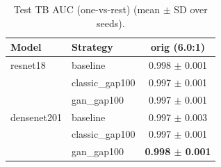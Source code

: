 \begin{table}[htbp]
\centering
\caption{Test TB AUC (one-vs-rest) (mean $\pm$ SD over seeds).}
\label{tab:tb_auc}
\begin{tabular}{llc}
\toprule
Model & Strategy & orig (6.0:1) \\
\midrule
resnet18 & baseline & 0.998 $\pm$ 0.001 \\
 & classic\_gap100 & 0.997 $\pm$ 0.001 \\
 & gan\_gap100 & 0.997 $\pm$ 0.001 \\
\addlinespace
densenet201 & baseline & 0.997 $\pm$ 0.003 \\
 & classic\_gap100 & 0.997 $\pm$ 0.001 \\
 & gan\_gap100 & \textbf{0.998 $\pm$ 0.001} \\
\bottomrule
\end{tabular}
\end{table}